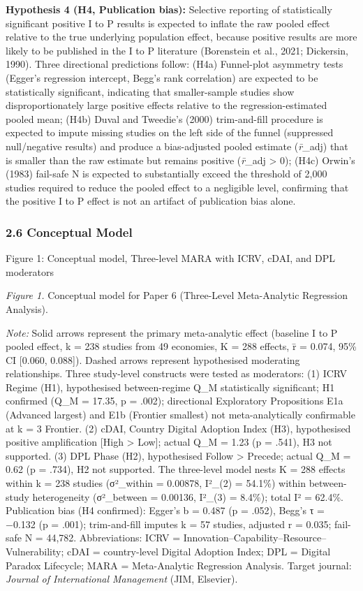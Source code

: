 \documentclass[
  12pt,a4paper]{article}
\begin{document}
\textbf{Hypothesis 4 (H4, Publication bias):} Selective reporting of
statistically significant positive I to P results is expected to inflate
the raw pooled effect relative to the true underlying population effect,
because positive results are more likely to be published in the I to P
literature (Borenstein et al., 2021; Dickersin, 1990). Three directional
predictions follow: (H4a) Funnel-plot asymmetry tests (Egger's
regression intercept, Begg's rank correlation) are expected to be
statistically significant, indicating that smaller-sample studies show
disproportionately large positive effects relative to the
regression-estimated pooled mean; (H4b) Duval and Tweedie's (2000)
trim-and-fill procedure is expected to impute missing studies on the
left side of the funnel (suppressed null/negative results) and produce a
bias-adjusted pooled estimate (\emph{r̄}\_adj) that is smaller than the
raw estimate but remains positive (\emph{r̄}\_adj \textgreater{} 0);
(H4c) Orwin's (1983) fail-safe N is expected to substantially exceed the
threshold of 2,000 studies required to reduce the pooled effect to a
negligible level, confirming that the positive I to P effect is not an
artifact of publication bias alone.

\hypertarget{conceptual-model}{%
\subsubsection{2.6 Conceptual Model}\label{conceptual-model}}

Figure 1: Conceptual model, Three-level MARA with ICRV, cDAI, and DPL
moderators

\emph{Figure 1.} Conceptual model for Paper 6 (Three-Level Meta-Analytic
Regression Analysis).

\emph{Note:} Solid arrows represent the primary meta-analytic effect
(baseline I to P pooled effect, k = 238 studies from 49 economies, K =
288 effects, r̄ = 0.074, 95\% CI {[}0.060, 0.088{]}). Dashed arrows
represent hypothesised moderating relationships. Three study-level
constructs were tested as moderators: (1) ICRV Regime (H1), hypothesised
between-regime Q\_M statistically significant; H1 confirmed (Q\_M =
17.35, p = .002); directional Exploratory Propositions E1a (Advanced
largest) and E1b (Frontier smallest) not meta-analytically confirmable
at k = 3 Frontier. (2) cDAI, Country Digital Adoption Index (H3),
hypothesised positive amplification {[}High \textgreater{} Low{]};
actual Q\_M = 1.23 (p = .541), H3 not supported. (3) DPL Phase (H2),
hypothesised Follow \textgreater{} Precede; actual Q\_M = 0.62 (p =
.734), H2 not supported. The three-level model nests K = 288 effects
within k = 238 studies (σ²\_within = 0.00878, I²\_(2) = 54.1\%) within
between-study heterogeneity (σ²\_between = 0.00136, I²\_(3) = 8.4\%);
total I² = 62.4\%. Publication bias (H4 confirmed): Egger's b = 0.487 (p
= .052), Begg's τ = −0.132 (p = .001); trim-and-fill imputes k = 57
studies, adjusted r = 0.035; fail-safe N = 44,782. Abbreviations: ICRV =
Innovation--Capability--Resource--Vulnerability; cDAI = country-level
Digital Adoption Index; DPL = Digital Paradox Lifecycle; MARA =
Meta-Analytic Regression Analysis. Target journal: \emph{Journal of
International Management} (JIM, Elsevier).
\end{document}
